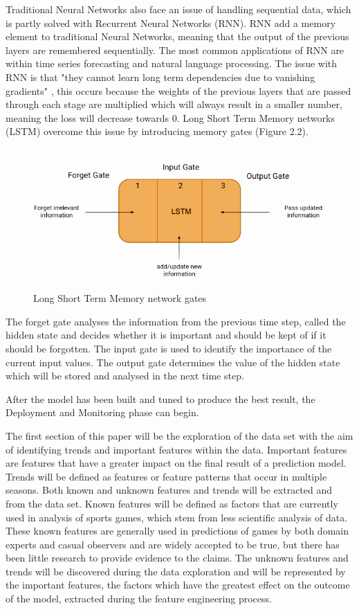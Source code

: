 \documentclass{imc-inf}
\begin{document}
	Traditional Neural Networks also face an issue of handling sequential data, which is partly solved with Recurrent Neural Networks (RNN). RNN add a memory element to traditional Neural Networks, meaning that the output of the previous layers are remembered sequentially. The most common applications of RNN are within time series forecasting and natural language processing. The issue with RNN is that "they cannot learn long term dependencies due to vanishing gradients" \cite{website:AV_LSTM}, this occurs because the weights of the previous layers that are passed through each stage are multiplied which will always result in a smaller number, meaning the loss will decrease towards 0. Long Short Term Memory networks (LSTM) overcome this issue by introducing memory gates (Figure 2.2).
	\begin{figure}
		\caption{Long Short Term Memory network gates}
		\includegraphics[width=15cm]{media/LSTM.png}
		\cite{website:AV_LSTM}
	\end{figure}
	The forget gate analyses the information from the previous time step, called the hidden state and decides whether it is important and should be kept of if it should be forgotten.
	The input gate is used to identify the importance of the current input values.
	The output gate determines the value of the hidden state which will be stored and analysed in the next time step.
	\newline
	
	After the model has been built and tuned to produce the best result, the Deployment and Monitoring phase can begin. 
	
	The first section of this paper will be the exploration of the data set with the aim of identifying trends and important features within the data. Important features are features that have a greater impact on the final result of a prediction model. Trends will be defined as features or feature patterns that occur in multiple seasons. Both known and unknown features and trends will be extracted and from the data set. Known features will be defined as factors that are currently used in analysis of sports games, which stem from less scientific analysis of data. These known features are generally used in predictions of games by both domain experts and casual observers and are widely accepted to be true, but there has been little research to provide evidence to the claims. The unknown features and trends will be discovered during the data exploration and will be represented by the important features, the factors which have the greatest effect on the outcome of the model, extracted during the feature engineering process.\newline
		
\end{document}
